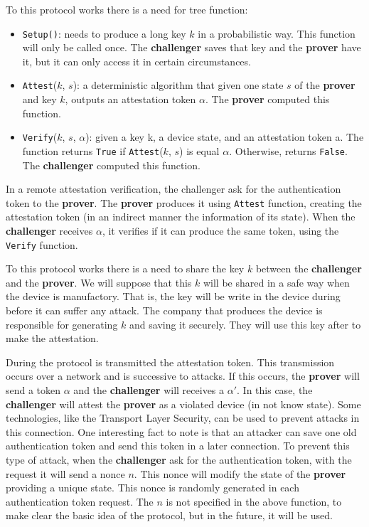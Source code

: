To this protocol works there is a need for tree function:
\begin{itemize}
	\item \verb|Setup()|: needs to produce a long key $k$ in a probabilistic way. This function will only be called once. The \textbf{challenger} saves that key and the \textbf{prover} have it, but it can only access it in certain circumstances.
	
	\item \verb|Attest|($k$, $s$): a deterministic algorithm that given one state $s$ of the \textbf{prover} and key $k$, outputs an attestation token $\alpha$. The \textbf{prover} computed this function.
	
	\item \verb|Verify|($k$, $s$, $\alpha$): given a key k, a device state, and an attestation token a. The function returns \verb|True| if \verb|Attest|($k$, $s$) is equal $\alpha$. Otherwise, returns \verb|False|. The \textbf{challenger} computed this function.
\end{itemize}

In a remote attestation verification, the challenger ask for the authentication token to the \textbf{prover}. The \textbf{prover} produces it using \verb|Attest| function, creating the attestation token (in an indirect manner the information of its state). When the \textbf{challenger} receives $\alpha$, it verifies if it can produce the same token, using the \verb|Verify| function.

To this protocol works there is a need to share the key $k$ between the \textbf{challenger} and the \textbf{prover}. We will suppose that this $k$ will be shared in a safe way when the device is manufactory. That is, the key will be write in the device during before it can suffer any attack. The company that produces the device is responsible for generating $k$ and saving it securely. They will use this key after to make the attestation.  

During the protocol is transmitted the attestation token. This transmission occurs over a network and is successive to attacks. If this occurs, the \textbf{prover} will send a token $\alpha$ and the \textbf{challenger} will receives a $\alpha'$. In this case, the \textbf{challenger} will attest the \textbf{prover}  as a violated device (in not know state).  Some technologies, like the Transport Layer Security, can be used to prevent attacks in this connection. One interesting fact to note is that an attacker can save one old authentication token and send this token in a later connection. To prevent this type of attack,  when the \textbf{challenger}  ask for the authentication token, with the request it will send a nonce $n$. This nonce will modify the state of the \textbf{prover} providing a unique state.  This nonce is randomly generated in each authentication token request. The $n$ is not specified in the above function, to make clear the basic idea of the protocol, but in the future, it will be used.

